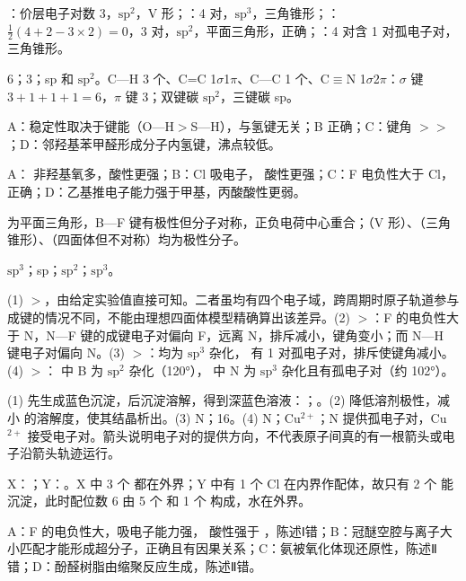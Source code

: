 \begin{jiexilist}
\item {}：价层电子对数 3，$\mathrm{sp}^2$，V 形；：4 对，$\mathrm{sp}^3$，三角锥形；：$\frac12(4+2-3\times2)=0$，3 对，$\mathrm{sp}^2$，平面三角形，正确；：4 对含 1 对孤电子对，三角锥形。
\item 6；3；sp 和 $\mathrm{sp}^2$。C—H 3 个、C=C 1$\sigma$1$\pi$、C—C 1 个、C$\equiv$N 1$\sigma$2$\pi$：$\sigma$ 键 $3+1+1+1=6$，$\pi$ 键 3；双键碳 $\mathrm{sp}^2$，三键碳 sp。
\item {}A：稳定性取决于键能（O—H$>$S—H），与氢键无关；B 正确；C：键角 $>$$>$；D：邻羟基苯甲醛形成分子内氢键，沸点较低。
\item {}A： 非羟基氧多，酸性更强；B：Cl 吸电子， 酸性更强；C：F 电负性大于 Cl，正确；D：乙基推电子能力强于甲基，丙酸酸性更弱。
\item {} 为平面三角形，B—F 键有极性但分子对称，正负电荷中心重合；（V 形）、（三角锥形）、（四面体但不对称）均为极性分子。
\item $\mathrm{sp}^3$；sp；$\mathrm{sp}^2$；$\mathrm{sp}^3$。
\item (1) $>$，由给定实验值直接可知。二者虽均有四个电子域，跨周期时原子轨道参与成键的情况不同，不能由理想四面体模型精确算出该差异。(2) $>$：F 的电负性大于 N，N—F 键的成键电子对偏向 F，远离 N，排斥减小，键角变小；而 N—H 键电子对偏向 N。(3) $>$：均为 $\mathrm{sp}^3$ 杂化， 有 1 对孤电子对，排斥使键角减小。(4) $>$： 中 B 为 $\mathrm{sp}^2$ 杂化（120°）， 中 N 为 $\mathrm{sp}^3$ 杂化且有孤电子对（约 102°）。
\item (1) 先生成蓝色沉淀，后沉淀溶解，得到深蓝色溶液：；。(2) 降低溶剂极性，减小  的溶解度，使其结晶析出。(3) N；16。(4) N；Cu$^{2+}$；N 提供孤电子对，Cu$^{2+}$ 接受电子对。箭头说明电子对的提供方向，不代表原子间真的有一根箭头或电子沿箭头轨迹运行。
\item X：；Y：。X 中 3 个  都在外界；Y 中有 1 个 Cl 在内界作配体，故只有 2 个  能沉淀，此时配位数 6 由 5 个  和 1 个  构成，水在外界。
\item {}A：F 的电负性大，吸电子能力强， 酸性强于 ，陈述Ⅰ错；B：冠醚空腔与离子大小匹配才能形成超分子，正确且有因果关系；C：氨被氧化体现还原性，陈述Ⅱ错；D：酚醛树脂由缩聚反应生成，陈述Ⅱ错。

\end{jiexilist}
